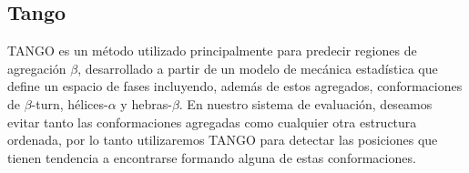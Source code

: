 % 
% 
% 
% 
% 




























\subsection{Tango}\label{tango}


TANGO \cite{fernandez2004prediction} es un método utilizado principalmente para predecir regiones de agregación $\beta$, desarrollado a partir de un modelo de mecánica estadística que define 
un espacio de fases incluyendo, además de estos agregados, conformaciones de $\beta$-turn, hélices-$\alpha$ y hebras-$\beta$.
En nuestro sistema de evaluación, deseamos evitar tanto las conformaciones agregadas como cualquier otra estructura ordenada, por lo tanto utilizaremos TANGO para detectar las posiciones que tienen tendencia a encontrarse formando
alguna de estas conformaciones.

